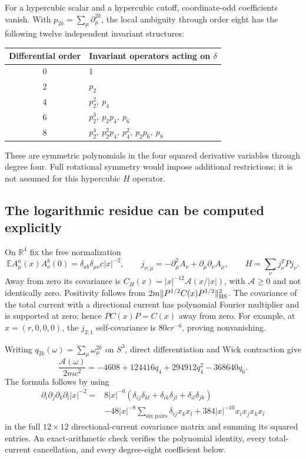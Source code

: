 \documentclass[11pt,letterpaper]{article}
\theoremstyle{plain}
\theoremstyle{remark}\newtheorem{remark}[theorem]{Scope}
\newcommand{\E}{\mathbb E}\newcommand{\R}{\mathbb R}
\begin{document}
For a hypercubic scalar and a hypercubic cutoff, coordinate-odd coefficients
vanish. With $p_{2k}=\sum_\mu\partial_\mu^{2k}$, the local ambiguity through
order eight has the following twelve independent invariant structures:
\begin{center}
\begin{tabular}{cl}
\toprule Differential order&Invariant operators acting on $\delta$\\\midrule
0&$1$\\
2&$p_2$\\
4&$p_2^2,\ p_4$\\
6&$p_2^3,\ p_2p_4,\ p_6$\\
8&$p_2^4,\ p_2^2p_4,\ p_4^2,\ p_2p_6,\ p_8$\\\bottomrule
\end{tabular}
\end{center}
These are symmetric polynomials in the four squared derivative variables through
degree four. Full rotational symmetry would impose additional restrictions;
it is not assumed for this hypercubic $H$ operator.

\subsection{The logarithmic residue can be computed explicitly}

On $\R^4$ fix the free normalization
\begin{equation}
\E A_\mu^a(x)A_\nu^b(0)=\delta_{ab}\delta_{\mu\nu}c|x|^{-2},\qquad
j_{\nu;\mu}=-\partial_\mu^2A_\nu+\partial_\mu\partial_\nu A_\mu,
\qquad H=\sum_\nu j_\nu^TPj_\nu.
\label{eq:freeconvention}
\end{equation}
Away from zero its covariance is $C_H(x)=|x|^{-12}\mathcal A(x/|x|)$,
with $\mathcal A\ge0$ and not identically zero. Positivity follows from
$2m\|P^{1/2}C(x)P^{1/2}\|_{\rm HS}^2$. The covariance of the total current
with a directional current has polynomial Fourier multiplier and is supported
at zero; hence $PC(x)P=C(x)$ away from zero. For example, at $x=(r,0,0,0)$,
the $j_{2;1}$ self-covariance is $80c r^{-6}$, proving nonvanishing.

Writing $q_{2k}(\omega)=\sum_\mu\omega_\mu^{2k}$ on $S^3$, direct differentiation
and Wick contraction give
\begin{equation}
\frac{\mathcal A(\omega)}{2mc^2}
=-4608+124416q_4+294912q_4^2-368640q_6.
\label{eq:angular}
\end{equation}
The formula follows by using
\begin{align*}
\partial_i\partial_j\partial_k\partial_l|x|^{-2}
={}&8|x|^{-6}(\delta_{ij}\delta_{kl}+\delta_{ik}\delta_{jl}+\delta_{il}\delta_{jk})\\
&-48|x|^{-8}\sum_{\text{six pairs}}\delta_{ij}x_kx_l
+384|x|^{-10}x_ix_jx_kx_l
\end{align*}
in the full $12\times12$ directional-current covariance matrix and summing its squared entries.
An exact-arithmetic check verifies the polynomial identity, every
total-current cancellation, and every degree-eight coefficient below.
\end{document}

